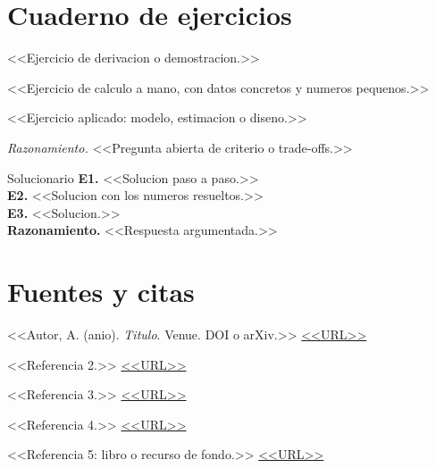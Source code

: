 \section{Cuaderno de ejercicios}

\exercise <<Ejercicio de derivacion o demostracion.>>

\exercise <<Ejercicio de calculo a mano, con datos concretos y numeros pequenos.>>

\exercise <<Ejercicio aplicado: modelo, estimacion o diseno.>>

\question \textit{Razonamiento.} <<Pregunta abierta de criterio o trade-offs.>>

\begin{solutions}{Solucionario}
\small
\textbf{E1.} <<Solucion paso a paso.>>\\[2pt]
\textbf{E2.} <<Solucion con los numeros resueltos.>>\\[2pt]
\textbf{E3.} <<Solucion.>>\\[2pt]
\textbf{Razonamiento.} <<Respuesta argumentada.>>
\end{solutions}

\section{Fuentes y citas}
{\small
\begin{enumerate}[leftmargin=1.4em, label={[\arabic*]}]
  \item <<Autor, A. (anio). \textit{Titulo}. Venue. DOI o arXiv.>> \url{<<URL>>}
  \item <<Referencia 2.>> \url{<<URL>>}
  \item <<Referencia 3.>> \url{<<URL>>}
  \item <<Referencia 4.>> \url{<<URL>>}
  \item <<Referencia 5: libro o recurso de fondo.>> \url{<<URL>>}
\end{enumerate}
}


